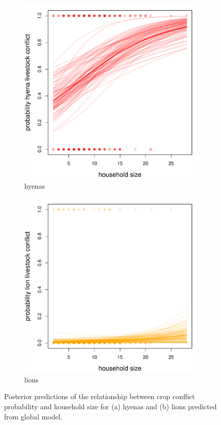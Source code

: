 \documentclass[12pt,]{article}
\begin{document}
\begin{figure}[H]
  \centering
	\begin{subfigure}[b]{0.49\textwidth}
	\includegraphics[width=\textwidth]{Figures/household_size_livestock_global_conflict_hyena.pdf} 
    \caption{hyenas}
   	    \label{fig:hhsHHhyena}
\end{subfigure}
\begin{subfigure}[b]{0.49\textwidth}
	\includegraphics[width=\textwidth]{Figures/household_size_livestock_global_conflict_lion.pdf}  
    \caption{lions}
  	\label{fig:cropHHleo}
\end{subfigure}
\caption{Posterior predictions of the relationship between crop conflict probability and household size for (a) hyenas and (b) lions predicted from global model.}
\end{figure}
\end{document}
